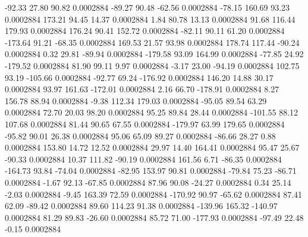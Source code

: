       -92.33       27.80       90.82     0.0002884
      -89.27       90.48      -62.56     0.0002884
      -78.15      160.69       93.23     0.0002884
      173.21       94.45       14.37     0.0002884
        1.84       80.78       13.13     0.0002884
       91.68      116.44      179.93     0.0002884
      176.24       90.41      152.72     0.0002884
      -82.11       90.11       61.20     0.0002884
     -173.64       91.21      -68.35     0.0002884
      169.53       21.57       93.98     0.0002884
      178.74      117.44      -90.24     0.0002884
        0.32       29.81      -89.94     0.0002884
     -179.58       93.09      164.99     0.0002884
      -77.85       24.92     -179.52     0.0002884
       81.90       99.11        9.97     0.0002884
       -3.17       23.00      -94.19     0.0002884
      102.75       93.19     -105.66     0.0002884
      -92.77       69.24     -176.92     0.0002884
      146.20       14.88       30.17     0.0002884
       93.97      161.63     -172.01     0.0002884
        2.16       66.70     -178.91     0.0002884
        8.27      156.78       88.94     0.0002884
       -9.38      112.34      179.03     0.0002884
      -95.05       89.54       63.29     0.0002884
       72.70       20.03       98.20     0.0002884
       95.25       89.84       28.44     0.0002884
     -101.55       88.12      107.68     0.0002884
       81.44       90.65       67.55     0.0002884
     -179.97       63.99      179.65     0.0002884
      -95.82       90.01       26.38     0.0002884
       95.06       65.09       89.27     0.0002884
      -86.66       28.27        0.88     0.0002884
      153.80       14.72       12.52     0.0002884
       29.97       14.40      164.41     0.0002884
       95.47       25.67      -90.33     0.0002884
       10.37      111.82      -90.19     0.0002884
      161.56        6.71      -86.35     0.0002884
     -164.73       93.84      -74.04     0.0002884
      -82.95      153.97       90.81     0.0002884
      -79.84       75.23      -86.71     0.0002884
       -1.67       92.13      -67.85     0.0002884
       87.96       90.08      -24.27     0.0002884
        0.34       25.14       -2.03     0.0002884
       -9.45      163.39       72.59     0.0002884
     -170.92       90.97      -65.62     0.0002884
       87.41       62.09      -89.42     0.0002884
       89.60      114.23       91.38     0.0002884
     -139.96      165.32     -140.97     0.0002884
       81.29       89.83      -26.60     0.0002884
       85.72       71.00     -177.93     0.0002884
      -97.49       22.48       -0.15     0.0002884
